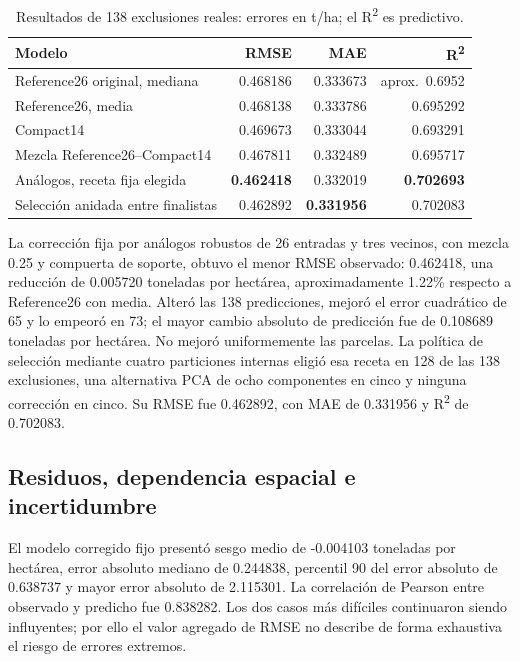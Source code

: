 \begin{table}[htbp]
\centering
\small
\caption{Resultados de 138 exclusiones reales: errores en t/ha; el R\textsuperscript{2} es predictivo.}
\label{tab:resultados}
\begin{tabular}{@{}lrrr@{}}
\toprule
Modelo & RMSE & MAE & R\textsuperscript{2}\\
\midrule
Reference26 original, mediana & 0.468186 & 0.333673 & aprox.\ 0.6952\\
Reference26, media & 0.468138 & 0.333786 & 0.695292\\
Compact14 & 0.469673 & 0.333044 & 0.693291\\
Mezcla Reference26--Compact14 & 0.467811 & 0.332489 & 0.695717\\
Análogos, receta fija elegida & \textbf{0.462418} & 0.332019 & \textbf{0.702693}\\
Selección anidada entre finalistas & 0.462892 & \textbf{0.331956} & 0.702083\\
\bottomrule
\end{tabular}
\end{table}

La corrección fija por análogos robustos de 26 entradas y tres vecinos, con mezcla 0.25 y compuerta de soporte, obtuvo el menor RMSE observado: 0.462418, una reducción de 0.005720 toneladas por hectárea, aproximadamente 1.22\% respecto a Reference26 con media. Alteró las 138 predicciones, mejoró el error cuadrático de 65 y lo empeoró en 73; el mayor cambio absoluto de predicción fue de 0.108689 toneladas por hectárea. No mejoró uniformemente las parcelas. La política de selección mediante cuatro particiones internas eligió esa receta en 128 de las 138 exclusiones, una alternativa PCA de ocho componentes en cinco y ninguna corrección en cinco. Su RMSE fue 0.462892, con MAE de 0.331956 y R\textsuperscript{2} de 0.702083.

\subsection*{Residuos, dependencia espacial e incertidumbre}
El modelo corregido fijo presentó sesgo medio de -0.004103 toneladas por hectárea, error absoluto mediano de 0.244838, percentil 90 del error absoluto de 0.638737 y mayor error absoluto de 2.115301. La correlación de Pearson entre observado y predicho fue 0.838282. Los dos casos más difíciles continuaron siendo influyentes; por ello el valor agregado de RMSE no describe de forma exhaustiva el riesgo de errores extremos.

